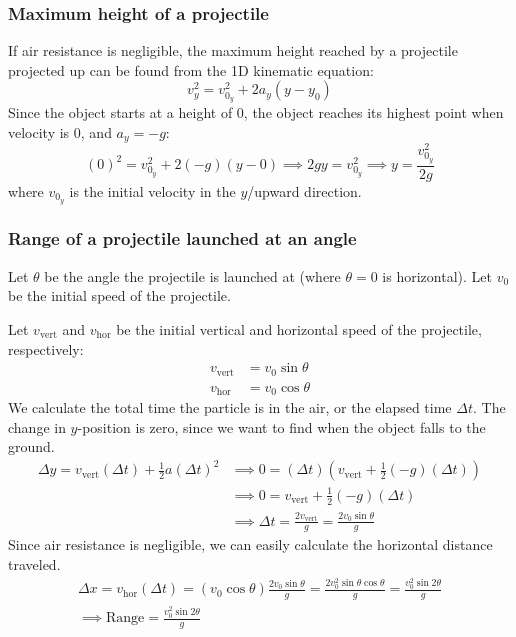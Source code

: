 \documentclass{article}
\begin{document}
\subsubsection{Maximum height of a projectile}
If air resistance is negligible, the maximum height reached by a projectile projected up can be found from the 1D kinematic equation:
\begin{equation*}
	v_y^2=v_{0_y}^2+2a_y(y-y_0)
\end{equation*}
Since the object starts at a height of $0$, the object reaches its highest point when velocity is $0$, and $a_y=-g$:
\begin{equation*}
	(0)^2=v_{0_y}^2+2(-g)(y-0)
	\implies 2gy=v_{0_y}^2
	\implies \boxed{y=\frac{v_{0_y}^2}{2g}}
\end{equation*}
where $v_{0_y}$ is the initial velocity in the $y$/upward direction.

\subsubsection{Range of a projectile launched at an angle}

Let $\theta$ be the angle the projectile is launched at (where $\theta=0$ is horizontal). Let $v_0$ be the initial speed of the projectile.

Let $v_{\text{vert}}$ and $v_{\text{hor}}$ be the initial vertical and horizontal speed of the projectile, respectively:
\begin{align*}
	v_{\text{vert}}&=v_0 \sin \theta \\
	v_{\text{hor}}&=v_0 \cos \theta
\end{align*}
We calculate the total time the particle is in the air, or the elapsed time $\Delta t$. The change in $y$-position is zero, since we want to find when the object falls to the ground.
\begin{align*}
	\Delta y=v_{\text{vert}}(\Delta t)+\frac12a(\Delta t)^2
	&\implies 0=(\Delta t)(v_{\text{vert}}+\frac12(-g)(\Delta t)) \\
	&\implies 0=v_{\text{vert}}+\frac12 (-g)(\Delta t) \\
	&\implies \Delta t= \frac{2 v_{\text{vert}}}{g}=\frac{2v_0\sin \theta}{g}
\end{align*}
Since air resistance is negligible, we can easily calculate the horizontal distance traveled.
\begin{gather*}
	\Delta x
	=v_{\text{hor}}(\Delta t)
	=(v_0\cos\theta)\frac{2v_0\sin\theta}{g}
	=\frac{2v_0^2 \sin\theta\cos\theta}{g}
	=\frac{v_0^2 \sin 2\theta}{g} \\
	\implies \boxed{\text{Range}=\frac{v_0^2\sin2\theta}{g}}
\end{gather*}
\end{document}
